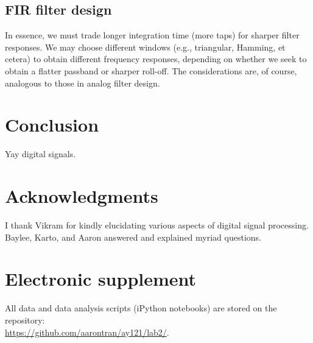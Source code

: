\documentclass[11pt]{article}
\begin{document}
\subsection{FIR filter design}

In essence, we must trade longer integration time (more taps) for sharper
filter responses.  We may choose different windows (e.g., triangular, Hamming,
et cetera) to obtain different frequency responses, depending on whether we
seek to obtain a flatter passband or sharper roll-off.  The considerations are,
of course, analogous to those in analog filter design.

\section{Conclusion}

Yay digital signals.

\section{Acknowledgments}

I thank Vikram for kindly elucidating various aspects of digital signal
processing.  Baylee, Karto, and Aaron answered and explained myriad questions.

\section{Electronic supplement}

All data and data analysis scripts (iPython notebooks) are stored on the
repository:\\
\href{https://github.com/aarontran/ay121}
{https://github.com/aarontran/ay121/lab2/}.
\end{document}
